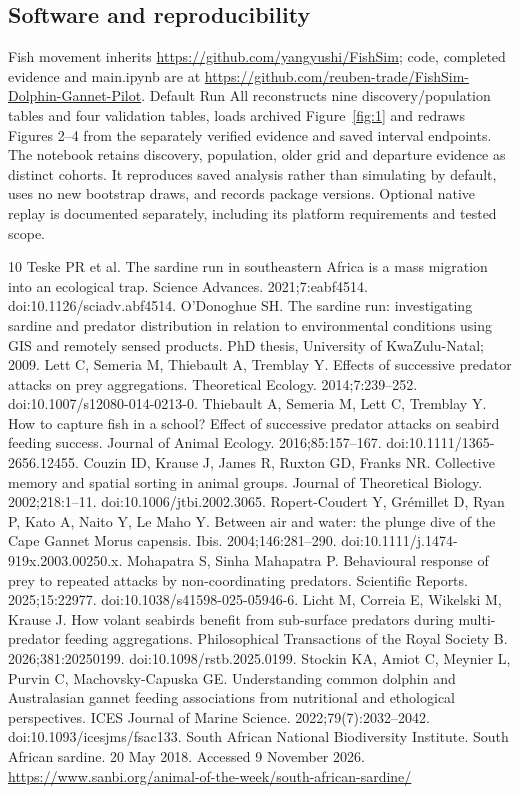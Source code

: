 \documentclass[10pt,a4paper,twocolumn]{article}
\begin{document}
\subsection{Software and reproducibility}
Fish movement inherits \url{https://github.com/yangyushi/FishSim}; code, completed evidence and main.ipynb are at \url{https://github.com/reuben-trade/FishSim-Dolphin-Gannet-Pilot}. Default Run All reconstructs nine discovery/population tables and four validation tables, loads archived Figure~\ref{fig:1} and redraws Figures 2--4 from the separately verified evidence and saved interval endpoints. The notebook retains discovery, population, older grid and departure evidence as distinct cohorts. It reproduces saved analysis rather than simulating by default, uses no new bootstrap draws, and records package versions. Optional native replay is documented separately, including its platform requirements and tested scope.

\begin{thebibliography}{10}
 Teske PR et al. The sardine run in southeastern Africa is a mass migration into an ecological trap. Science Advances. 2021;7:eabf4514. doi:10.1126/sciadv.abf4514.
 O'Donoghue SH. The sardine run: investigating sardine and predator distribution in relation to environmental conditions using GIS and remotely sensed products. PhD thesis, University of KwaZulu-Natal; 2009.
 Lett C, Semeria M, Thiebault A, Tremblay Y. Effects of successive predator attacks on prey aggregations. Theoretical Ecology. 2014;7:239--252. doi:10.1007/s12080-014-0213-0.
 Thiebault A, Semeria M, Lett C, Tremblay Y. How to capture fish in a school? Effect of successive predator attacks on seabird feeding success. Journal of Animal Ecology. 2016;85:157--167. doi:10.1111/1365-2656.12455.
 Couzin ID, Krause J, James R, Ruxton GD, Franks NR. Collective memory and spatial sorting in animal groups. Journal of Theoretical Biology. 2002;218:1--11. doi:10.1006/jtbi.2002.3065.
 Ropert-Coudert Y, Grémillet D, Ryan P, Kato A, Naito Y, Le Maho Y. Between air and water: the plunge dive of the Cape Gannet Morus capensis. Ibis. 2004;146:281--290. doi:10.1111/j.1474-919x.2003.00250.x.
 Mohapatra S, Sinha Mahapatra P. Behavioural response of prey to repeated attacks by non-coordinating predators. Scientific Reports. 2025;15:22977. doi:10.1038/s41598-025-05946-6.
 Licht M, Correia E, Wikelski M, Krause J. How volant seabirds benefit from sub-surface predators during multi-predator feeding aggregations. Philosophical Transactions of the Royal Society B. 2026;381:20250199. doi:10.1098/rstb.2025.0199.
 Stockin KA, Amiot C, Meynier L, Purvin C, Machovsky-Capuska GE. Understanding common dolphin and Australasian gannet feeding associations from nutritional and ethological perspectives. ICES Journal of Marine Science. 2022;79(7):2032--2042. doi:10.1093/icesjms/fsac133.
 South African National Biodiversity Institute. South African sardine. 20 May 2018. Accessed 9 November 2026. \url{https://www.sanbi.org/animal-of-the-week/south-african-sardine/}
\end{thebibliography}
\end{document}
